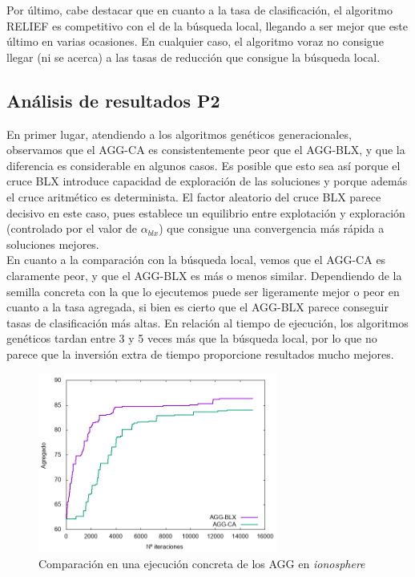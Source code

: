 \documentclass[12pt]{article}
\begin{document}
Por último, cabe destacar que en cuanto a la tasa de clasificación, el algoritmo RELIEF es competitivo con el de la búsqueda local, llegando a ser mejor que este último en varias ocasiones. En cualquier caso, el algoritmo voraz no consigue llegar (ni se acerca) a las tasas de reducción que consigue la búsqueda local.

\subsection*{Análisis de resultados P2}
\label{analisis}

En primer lugar, atendiendo a los algoritmos genéticos generacionales, observamos que el AGG-CA es consistentemente peor que el AGG-BLX, y que la diferencia es considerable en algunos casos. Es posible que esto sea así porque el cruce BLX introduce capacidad de exploración de las soluciones y porque además el cruce aritmético es determinista. El factor aleatorio del cruce BLX parece decisivo en este caso, pues establece un equilibrio entre explotación y exploración (controlado por el valor de $\alpha_{blx}$) que consigue una convergencia más rápida a soluciones mejores.\\

En cuanto a la comparación con la búsqueda local, vemos que el AGG-CA es claramente peor, y que el AGG-BLX es más o menos similar. Dependiendo de la semilla concreta con la que lo ejecutemos puede ser ligeramente mejor o peor en cuanto a la tasa agregada, si bien es cierto que el AGG-BLX parece conseguir tasas de clasificación más altas. En relación al tiempo de ejecución, los algoritmos genéticos tardan entre 3 y 5 veces más que la búsqueda local, por lo que no parece que la inversión extra de tiempo proporcione resultados mucho mejores.\\

\begin{figure}[ht!]
    \centering
    \includegraphics[width=0.7\textwidth]{img/AGG.png}
	\caption{Comparación en una ejecución concreta de los AGG en \textit{ionosphere}}
\end{figure}
\end{document}
